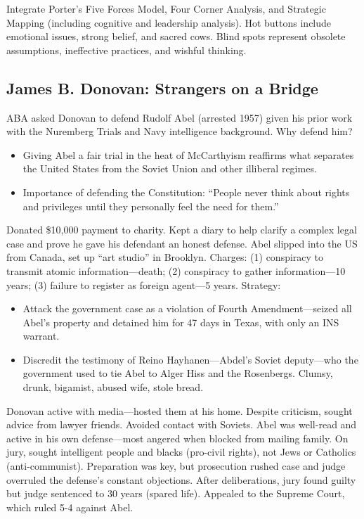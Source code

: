 \documentclass[
]{article}
\begin{document}
Integrate Porter's Five Forces Model, Four Corner Analysis, and
Strategic Mapping (including cognitive and leadership analysis). Hot
buttons include emotional issues, strong belief, and sacred cows. Blind
spots represent obsolete assumptions, ineffective practices, and wishful
thinking.

\hypertarget{james-b.-donovan-strangers-on-a-bridge}{%
\subsection{James B. Donovan: Strangers on a
Bridge}\label{james-b.-donovan-strangers-on-a-bridge}}

ABA asked Donovan to defend Rudolf Abel (arrested 1957) given his prior
work with the Nuremberg Trials and Navy intelligence background. Why
defend him?

\begin{itemize}
\item
  Giving Abel a fair trial in the heat of McCarthyism reaffirms what
  separates the United States from the Soviet Union and other illiberal
  regimes.
\item
  Importance of defending the Constitution: ``People never think about
  rights and privileges until they personally feel the need for them.''
\end{itemize}

Donated \$10,000 payment to charity. Kept a diary to help clarify a
complex legal case and prove he gave his defendant an honest defense.
Abel slipped into the US from Canada, set up ``art studio'' in Brooklyn.
Charges: (1) conspiracy to transmit atomic information---death; (2)
conspiracy to gather information---10 years; (3) failure to register as
foreign agent---5 years. Strategy:

\begin{itemize}
\item
  Attack the government case as a violation of Fourth Amendment---seized
  all Abel's property and detained him for 47 days in Texas, with only
  an INS warrant.
\item
  Discredit the testimony of Reino Hayhanen---Abdel's Soviet
  deputy---who the government used to tie Abel to Alger Hiss and the
  Rosenbergs. Clumsy, drunk, bigamist, abused wife, stole bread.
\end{itemize}

Donovan active with media---hosted them at his home. Despite criticism,
sought advice from lawyer friends. Avoided contact with Soviets. Abel
was well-read and active in his own defense---most angered when blocked
from mailing family. On jury, sought intelligent people and blacks
(pro-civil rights), not Jews or Catholics (anti-communist). Preparation
was key, but prosecution rushed case and judge overruled the defense's
constant objections. After deliberations, jury found guilty but judge
sentenced to 30 years (spared life). Appealed to the Supreme Court,
which ruled 5-4 against Abel.
\end{document}
